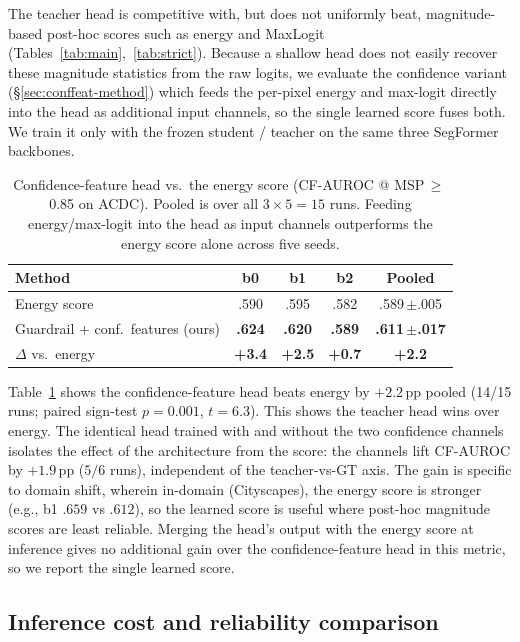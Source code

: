 \documentclass{article}
\newcommand{\win}[1]{\textcolor{wingreen}{\textbf{#1}}}
\begin{document}
The teacher head is competitive with, but does not uniformly beat, magnitude-based post-hoc scores such as energy and MaxLogit (Tables~\ref{tab:main},~\ref{tab:strict}). Because a shallow head does not easily recover these magnitude statistics from the raw logits, we evaluate the confidence variant (\S\ref{sec:conffeat-method}) which feeds the per-pixel energy and max-logit directly into the head as additional input channels, so the single learned score fuses both. We train it only with the frozen student / teacher on the same three SegFormer backbones.


\begin{table}[H]
\centering
\small
\setlength{\tabcolsep}{6pt}
\caption{Confidence-feature head vs.\ the energy score (CF-AUROC @ MSP$\,{\geq}\,$0.85 on ACDC). Pooled is over all $3{\times}5{=}15$ runs. Feeding energy/max-logit into the head as input channels outperforms the energy score alone across five seeds.}
\label{tab:conffeat}
\begin{tabular}{lcccc}
\toprule
Method & b0 & b1 & b2 & Pooled \\
\midrule
Energy score      & .590 & .595 & .582 & .589\,{\scriptsize$\pm$.005} \\
Guardrail $+$ conf.\ features (ours) & \win{.624} & \win{.620} & \win{.589} & \win{.611\,{\scriptsize$\pm$.017}} \\
\midrule
$\Delta$ vs.\ energy & \win{+3.4} & \win{+2.5} & \win{+0.7} & \win{+2.2} \\
\bottomrule
\end{tabular}
\end{table}


Table~\ref{tab:conffeat} shows the confidence-feature head beats energy by $+2.2$\,pp pooled (14/15 runs; paired sign-test $p{=}0.001$, $t{=}6.3$). This shows the teacher head wins over energy. The identical head trained with and without the two confidence channels isolates the effect of the architecture from the score: the channels lift CF-AUROC by $+1.9$\,pp ($5/6$ runs), independent of the teacher-vs-GT axis. The gain is specific to domain shift, wherein in-domain (Cityscapes), the energy score is stronger (e.g., b1 $.659$ vs $.612$), so the learned score is useful where post-hoc magnitude scores are least reliable. Merging the head's output with the energy score at inference gives no additional gain over the confidence-feature head in this metric, so we report the single learned score.


\subsection{Inference cost and reliability comparison}
\label{sec:latency}
\end{document}

